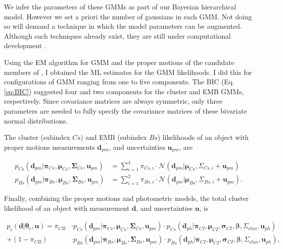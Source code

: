 We infer the parameters of these GMMs as part of our Bayesian hierarchical model. However we set a priori the number of gaussians in each GMM. Not doing so will demand a technique in which the model parameters can be augmented. Although such techniques already exist, they are still under computational development \cite[see][for a review of reversible jump MCMC]{Fan2011}.

Using the EM algorithm for GMM and the proper motions of the candidate members of \citet{Bouy2015}, I obtained the ML estimates for the GMM likelihoods. I did this for configurations of GMM ranging from one to five components. The BIC (Eq. \ref{eq:BIC}) suggested four and two components for the cluster and EMB GMMs, respectively. Since covariance matrices are always symmetric, only three parameters are needed to fully specify the covariance matrices of these bivariate normal distributions.

The cluster (subindex $Cs$) and EMB (subindex $Bs$) likelihoods of an object with proper motions measurements $\mathbf{d}_{pm}$, and uncertainties $\mathbf{u}_{pm}$, are

\begin{align}
p_{Cs}(\mathbf{d}_{pm}| \boldsymbol{\pi}_{Cs}, \boldsymbol{\mu}_{Cs},\boldsymbol{\Sigma}_{Cs},\mathbf{u}_{pm})
&= \sum_{i=1}^4\pi_{Cs,i}\cdot \mathcal{N}(\mathbf{d}_{pm} | \boldsymbol{\mu}_{Cs},\Sigma_{Cs,i}+\mathbf{u}_{pm}) \nonumber\\
p_{Bs}(\mathbf{d}_{pm}| \boldsymbol{\pi}_{Bs}, \boldsymbol{\mu}_{Bs},\boldsymbol{\Sigma}_{Bs},\mathbf{u}_{pm})
&= \sum_{i=1}^2\pi_{Bs,i}\cdot \mathcal{N}(\mathbf{d}_{pm} | \boldsymbol{\mu}_{Bs},\Sigma_{Bs,i}+\mathbf{u}_{pm}).
\label{eq:lik-pm}
\end{align}

Finally, combining the proper motions and photometric models, the total cluster likelihood of an object with measurement $\mathbf{d}$, and uncertainties $\mathbf{u}$, is

\begin{align}
p_c(\mathbf{d}|\boldsymbol{\theta}_c,\mathbf{u})=\pi_{CB}&\cdot p_{Cs}(\mathbf{d}_{pm}| \boldsymbol{\pi}_{Cs}, \boldsymbol{\mu}_{Cs},\boldsymbol{\Sigma}_{Cs},\mathbf{u}_{pm}) \cdot  p_{Cs}(\mathbf{d}_{ph}|\boldsymbol{\pi}_{CI},\boldsymbol{\mu}_{CI},\boldsymbol{\sigma}_{CI},\boldsymbol{\beta},\Sigma_{clus},\mathbf{u}_{ph})\nonumber\\
+(1-\pi_{CB})&\cdot p_{Bs}(\mathbf{d}_{pm}| \boldsymbol{\pi}_{Bs}, \boldsymbol{\mu}_{Bs},\boldsymbol{\Sigma}_{Bs},\mathbf{u}_{pm}) \cdot  p_{Bs}(\mathbf{d}_{ph}|\boldsymbol{\pi}_{CI},\boldsymbol{\mu}_{CI},\boldsymbol{\sigma}_{CI}, \boldsymbol{\beta},\Sigma_{clus}, \mathbf{u}_{ph}),
\end{align}

